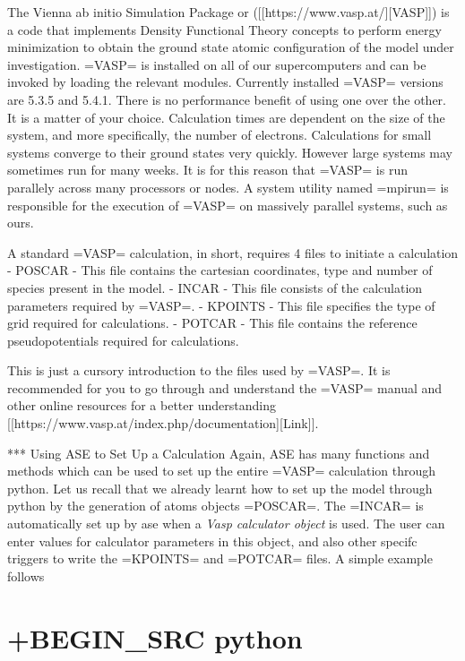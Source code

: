 \documentclass[11pt]{article}
\begin{document}
The Vienna ab initio Simulation Package or
({[}{[}https://www.vasp.at/{]}{[}VASP{]}{]}) is a code that implements
Density Functional Theory concepts to perform energy minimization to
obtain the ground state atomic configuration of the model under
investigation. =VASP= is installed on all of our supercomputers and can
be invoked by loading the relevant modules. Currently installed =VASP=
versions are 5.3.5 and 5.4.1. There is no performance benefit of using
one over the other. It is a matter of your choice. Calculation times are
dependent on the size of the system, and more specifically, the number
of electrons. Calculations for small systems converge to their ground
states very quickly. However large systems may sometimes run for many
weeks. It is for this reason that =VASP= is run parallely across many
processors or nodes. A system utility named =mpirun= is responsible for
the execution of =VASP= on massively parallel systems, such as ours.

A standard =VASP= calculation, in short, requires 4 files to initiate a
calculation - POSCAR - This file contains the cartesian coordinates,
type and number of species present in the model. - INCAR - This file
consists of the calculation parameters required by =VASP=. - KPOINTS -
This file specifies the type of grid required for calculations. - POTCAR
- This file contains the reference pseudopotentials required for
calculations.

This is just a cursory introduction to the files used by =VASP=. It is
recommended for you to go through and understand the =VASP= manual and
other online resources for a better understanding
{[}{[}https://www.vasp.at/index.php/documentation{]}{[}Link{]}{]}.

*** Using ASE to Set Up a Calculation Again, ASE has many functions and
methods which can be used to set up the entire =VASP= calculation
through python. Let us recall that we already learnt how to set up the
model through python by the generation of atoms objects =POSCAR=. The
=INCAR= is automatically set up by ase when a \emph{Vasp calculator
object} is used. The user can enter values for calculator parameters in
this object, and also other specifc triggers to write the =KPOINTS= and
=POTCAR= files. A simple example follows

\section{+BEGIN\_SRC python}\label{begin_src-python-8}
\end{document}
